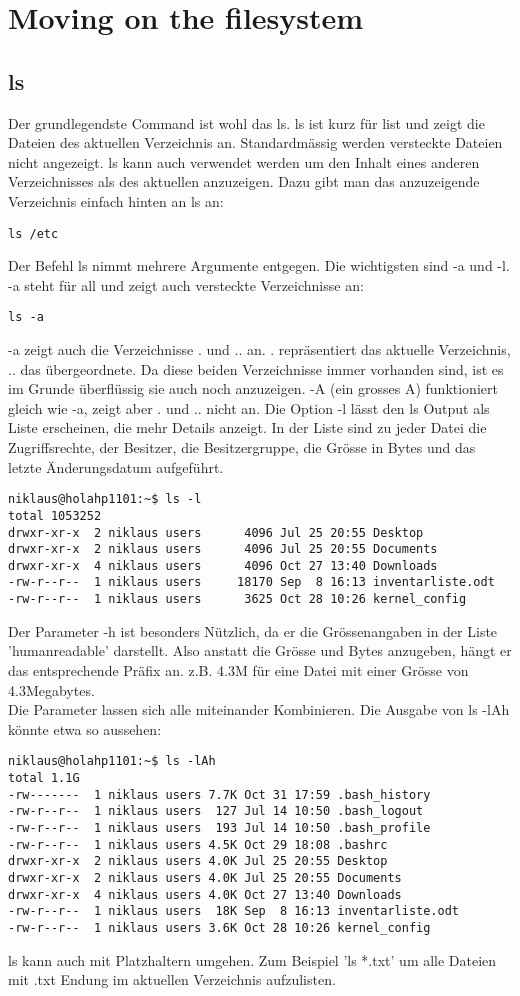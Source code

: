 
\section{Moving on the filesystem}
\subsection{ls}
Der grundlegendste Command ist wohl das ls. ls ist kurz f\"ur list und zeigt die Dateien des aktuellen Verzeichnis an. Standardm\"assig werden versteckte Dateien nicht angezeigt. ls kann auch verwendet werden um den Inhalt eines anderen Verzeichnisses als des aktuellen anzuzeigen. Dazu gibt man das anzuzeigende Verzeichnis einfach hinten an ls an:
\begin{lstlisting}
ls /etc
\end{lstlisting}
Der Befehl ls nimmt mehrere Argumente entgegen. Die wichtigsten sind -a und -l.\\
-a steht f\"ur all und zeigt auch versteckte Verzeichnisse an:
\begin{lstlisting}
ls -a
\end{lstlisting}
-a zeigt auch die Verzeichnisse . und .. an. . repr\"asentiert das aktuelle Verzeichnis, .. das \"ubergeordnete. Da diese beiden Verzeichnisse immer vorhanden sind, ist es im Grunde \"uberfl\"ussig sie auch noch anzuzeigen. -A (ein grosses A) funktioniert gleich wie -a, zeigt aber . und .. nicht an.
Die Option -l l\"asst den ls Output als Liste erscheinen, die mehr Details anzeigt. In der Liste sind zu jeder Datei die Zugriffsrechte, der Besitzer, die Besitzergruppe, die Gr\"osse in Bytes und das letzte \"Anderungsdatum aufgef\"uhrt.
\begin{lstlisting}
niklaus@holahp1101:~$ ls -l
total 1053252
drwxr-xr-x  2 niklaus users      4096 Jul 25 20:55 Desktop
drwxr-xr-x  2 niklaus users      4096 Jul 25 20:55 Documents
drwxr-xr-x  4 niklaus users      4096 Oct 27 13:40 Downloads
-rw-r--r--  1 niklaus users     18170 Sep  8 16:13 inventarliste.odt
-rw-r--r--  1 niklaus users      3625 Oct 28 10:26 kernel_config
\end{lstlisting}
Der Parameter -h ist besonders N\"utzlich, da er die Gr\"ossenangaben in der Liste 'humanreadable' darstellt. Also anstatt die Gr\"osse und Bytes anzugeben, h\"angt er das entsprechende Pr\"afix an. z.B. 4.3M f\"ur eine Datei mit einer Gr\"osse von 4.3Megabytes.\\
Die Parameter lassen sich alle miteinander Kombinieren. Die Ausgabe von ls -lAh k\"onnte etwa so aussehen:
\begin{lstlisting}
niklaus@holahp1101:~$ ls -lAh
total 1.1G
-rw-------  1 niklaus users 7.7K Oct 31 17:59 .bash_history
-rw-r--r--  1 niklaus users  127 Jul 14 10:50 .bash_logout
-rw-r--r--  1 niklaus users  193 Jul 14 10:50 .bash_profile
-rw-r--r--  1 niklaus users 4.5K Oct 29 18:08 .bashrc
drwxr-xr-x  2 niklaus users 4.0K Jul 25 20:55 Desktop
drwxr-xr-x  2 niklaus users 4.0K Jul 25 20:55 Documents
drwxr-xr-x  4 niklaus users 4.0K Oct 27 13:40 Downloads
-rw-r--r--  1 niklaus users  18K Sep  8 16:13 inventarliste.odt
-rw-r--r--  1 niklaus users 3.6K Oct 28 10:26 kernel_config
\end{lstlisting}
ls kann auch mit Platzhaltern umgehen. Zum Beispiel 'ls *.txt' um alle Dateien mit .txt Endung im aktuellen Verzeichnis aufzulisten.
